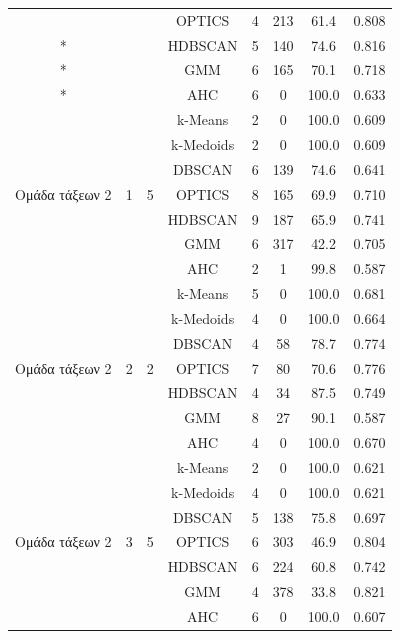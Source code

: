 \begin{longtable}{cccccccc}
& & & OPTICS & 4 & 213 & 61.4 & 0.808 \\*
& & & HDBSCAN & 5 & 140 & 74.6 & 0.816 \\*
& & & GMM & 6 & 165 & 70.1 & 0.718 \\*
& & & AHC & 6 & 0 & 100.0 & 0.633 \\
\midrule
\multirow{7}{*}{Ομάδα τάξεων 2} & \multirow{7}{*}{1} & \multirow{7}{*}{5} & k-Means & 2 & 0 & 100.0 & 0.609 \\*
& & & k-Medoids & 2 & 0 & 100.0 & 0.609 \\*
& & & DBSCAN & 6 & 139 & 74.6 & 0.641 \\*
& & & OPTICS & 8 & 165 & 69.9 & 0.710 \\*
& & & HDBSCAN & 9 & 187 & 65.9 & 0.741 \\*
& & & GMM & 6 & 317 & 42.2 & 0.705 \\*
& & & AHC & 2 & 1 & 99.8 & 0.587 \\
\midrule
\multirow{7}{*}{Ομάδα τάξεων 2} & \multirow{7}{*}{2} & \multirow{7}{*}{2} & k-Means & 5 & 0 & 100.0 & 0.681 \\*
& & & k-Medoids & 4 & 0 & 100.0 & 0.664 \\*
& & & DBSCAN & 4 & 58 & 78.7 & 0.774 \\*
& & & OPTICS & 7 & 80 & 70.6 & 0.776 \\*
& & & HDBSCAN & 4 & 34 & 87.5 & 0.749 \\*
& & & GMM & 8 & 27 & 90.1 & 0.587 \\*
& & & AHC & 4 & 0 & 100.0 & 0.670 \\
\midrule
\multirow{7}{*}{Ομάδα τάξεων 2} & \multirow{7}{*}{3} & \multirow{7}{*}{5} & k-Means & 2 & 0 & 100.0 & 0.621 \\*
& & & k-Medoids & 4 & 0 & 100.0 & 0.621 \\*
& & & DBSCAN & 5 & 138 & 75.8 & 0.697 \\*
& & & OPTICS & 6 & 303 & 46.9 & 0.804 \\*
& & & HDBSCAN & 6 & 224 & 60.8 & 0.742 \\*
& & & GMM & 4 & 378 & 33.8 & 0.821 \\*
& & & AHC & 6 & 0 & 100.0 & 0.607 \\
\end{longtable}
\endgroup


